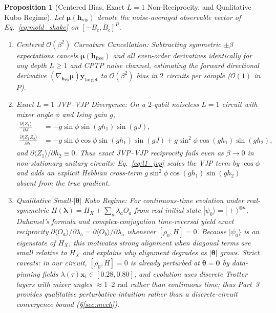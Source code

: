 \documentclass[11pt]{article}
\newtheorem{proposition}{Proposition}
\begin{document}
\begin{proposition}[Centered Bias, Exact $L{=}1$ Non-Reciprocity, and Qualitative Kubo Regime]
\label{prop:centered_bias}
Let $\boldsymbol{\mu}(\mathbf{h}_{\text{vis}})$ denote the noise-averaged observable vector of Eq.~\eqref{eq:mold_shake} on $[-B_c, B_c]^P$.
\begin{enumerate}[leftmargin=1.4em,itemsep=2pt,topsep=2pt]
  \item \emph{Centered $\mathcal{O}(\beta^2)$ Curvature Cancellation:} Subtracting symmetric $\pm\beta$ expectations cancels $\boldsymbol{\mu}(\mathbf{h}_{\text{free}})$ and all even-order derivatives identically for any depth $L\ge 1$ and CPTP noise channel, estimating the forward directional derivative $(\nabla_{\mathbf{h}_{\text{vis}}}\boldsymbol{\mu})\mathbf{y}_{\text{target}}$ to $\mathcal{O}(\beta^2)$ bias in $2$ circuits per sample ($\mathcal{O}(1)$ in $P$).
  \item \emph{Exact $L{=}1$ JVP--VJP Divergence:} On a $2$-qubit noiseless $L{=}1$ circuit with mixer angle $\phi$ and Ising gain $g$,
  \begin{align}
    \frac{\partial \langle Z_1\rangle}{\partial J} &= -g\sin\phi\sin(gh_1)\sin(gJ), \label{eq:l1_vjp}\\
    \frac{\partial \langle Z_1 Z_2\rangle}{\partial h_1} &= -g\sin\phi\cos\phi\sin(gh_1)\sin(gJ) + g\sin^2\phi\cos(gh_1)\sin(gh_2), \label{eq:l1_jvp}
  \end{align}
  and $\partial\langle Z_1\rangle/\partial h_2 \equiv 0$. Thus exact JVP--VJP reciprocity fails even as $\beta{\to}0$ in non-stationary unitary circuits: Eq.~\eqref{eq:l1_jvp} scales the VJP term by $\cos\phi$ and adds an explicit Hebbian cross-term $g\sin^2\phi\cos(gh_1)\sin(gh_2)$ absent from the true gradient.
  \item \emph{Qualitative Small-$|\boldsymbol{\theta}|$ Kubo Regime:} For continuous-time evolution under real-symmetric $H(\boldsymbol{\lambda})=H_X+\sum_a\lambda_a O_a$ from real initial state $|\psi_0\rangle=|+\rangle^{\otimes n}$, Duhamel's formula and complex-conjugation time-reversal yield exact reciprocity $\partial\langle O_a\rangle/\partial\lambda_b = \partial\langle O_b\rangle/\partial\lambda_a$ whenever $[\rho_0, H]=0$. Because $|\psi_0\rangle$ is an eigenstate of $H_X$, this motivates strong alignment when diagonal terms are small relative to $H_X$ and explains why alignment degrades as $|\boldsymbol{\theta}|$ grows. \emph{Strict caveats:} in our circuit, $[\rho_0, H]{=}0$ is already perturbed at $\boldsymbol{\theta}{=}\mathbf{0}$ by data-pinning fields $\lambda(\tau)\mathbf{x}_t\in[0.28,0.80]$, and evolution uses discrete Trotter layers with mixer angles $\approx 1$--$2\text{ rad}$ rather than continuous time; thus Part~3 provides qualitative perturbative intuition rather than a discrete-circuit convergence bound (\S\ref{sec:mech}).
\end{enumerate}
\end{proposition}
\end{document}
